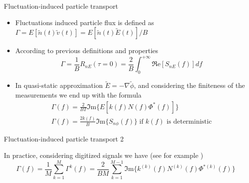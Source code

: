 \documentclass[t,10pt]{beamer}
\begin{document}
\begin{frame}{Fluctuation-induced particle transport}
\begin{itemize}
\item Fluctuations induced particle flux is defined as $\Gamma = E[\tilde{n}(t)\tilde{v}(t)]=E[\tilde{n}(t)\tilde{E}(t)]/B$
\item According to previous definitions and properties 
\begin{equation*}
\Gamma
=\frac{1}{B}R_{nE}(\tau=0)= \frac{2}{B}\int_0^{+\infty}\Re\text{e}[S_{nE}(f)]df
\end{equation*}
\item In quasi-static approximation $\tilde{E}=-\nabla\tilde{\phi}$,
  and considering the finiteness of the measurements we
  end up with the formula
\begin{eqnarray*}
\Gamma(f) = \frac{2}{BT}\Im\text{m}\{ E[k(f)N(f)\Phi^{*}(f)]\} \\
\Gamma(f)=\frac{2k(f)}{B}\Im\text{m}\{S_{n\phi}(f)\} \; \text{if $k(f)$ is deterministic}
\end{eqnarray*}
\end{itemize}
\end{frame}

\begin{frame}{Fluctuation-induced particle transport 2}
\begin{itemize}
{\footnotesize
\item In practice, considering digitized signals we have
  \footnotesize{(see for example \parencite{Antoni:2000bn})}
\begin{equation*}
\Gamma(f)=\frac{1}{M}\sum_{k=1}^{M}\Gamma^{k}(f) = \frac{2}{BM}\sum_{k=1}^{M-1}\Im\text{m}\{k^{(k)}(f)N^{(k)}(f)\Phi^{*(k)}(f)\}
\end{equation*}
}


\end{itemize}
\end{frame}
\end{document}
